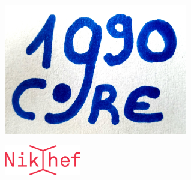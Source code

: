 \begin{titlepage}
	\maketitle
	\thispagestyle{titlepage}
	\begin{center}
	\vspace{5cm}
    \includegraphics[width=0.60\textwidth]{./Images/Core1990_logo.jpg}  
	\end{center}
	\vspace{2cm}
	\begin{center}
	\includegraphics[width=0.25\textwidth]{./Template/pictures/NewNikheflogoCMYK.pdf}  	
	\end{center}
	\newpage
\end{titlepage}